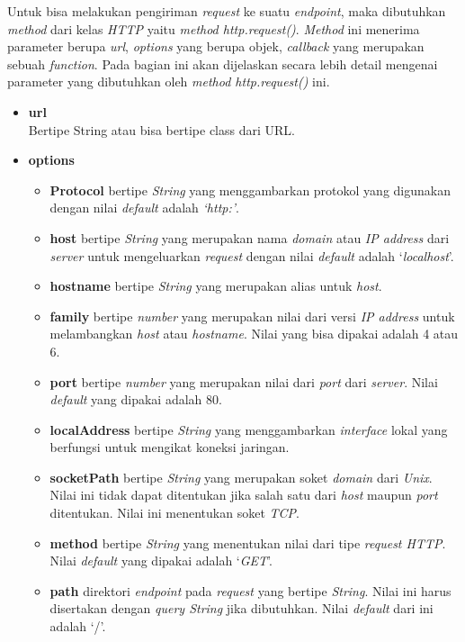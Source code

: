 \documentclass[a4paper,twoside]{article}
\begin{document}
\begin{enumerate}
Untuk bisa melakukan pengiriman \textit{request} ke suatu \textit{endpoint}, maka dibutuhkan \textit{method} dari kelas \textit{HTTP} yaitu \textit{method http.request()}. \textit{Method} ini menerima parameter berupa \textit{url}, \textit{options} yang berupa objek, \textit{callback} yang merupakan sebuah \textit{function}. Pada bagian ini akan dijelaskan secara lebih detail mengenai parameter yang dibutuhkan oleh \textit{method http.request()} ini. 
\begin{itemize}
	\item \textbf{url}\\
	Bertipe String atau bisa bertipe class dari URL. 
	\item \textbf{options}
	\begin{itemize}
		\item \textbf{Protocol} bertipe \textit{String} yang menggambarkan protokol yang digunakan dengan nilai \textit{default} adalah \textit{`http:'}. 
		\item \textbf{host} bertipe \textit{String} yang merupakan nama \textit{domain} atau \textit{IP address} dari \textit{server} untuk mengeluarkan \textit{request} dengan nilai \textit{default} adalah `\textit{localhost}'. 
		\item \textbf{hostname} bertipe \textit{String} yang merupakan alias untuk \textit{host}.
		\item \textbf{family} bertipe \textit{number} yang merupakan nilai dari versi \textit{IP address} untuk melambangkan \textit{host} atau \textit{hostname}. Nilai yang bisa dipakai adalah 4 atau 6. 
		\item \textbf{port} bertipe \textit{number} yang merupakan nilai dari \textit{port} dari \textit{server}. Nilai \textit{default} yang dipakai adalah 80. 
		\item \textbf{localAddress} bertipe \textit{String} yang menggambarkan \textit{interface} lokal yang berfungsi untuk mengikat koneksi jaringan. 
		\item \textbf{socketPath} bertipe \textit{String} yang merupakan soket \textit{domain} dari \textit{Unix}. Nilai ini tidak dapat ditentukan jika salah satu dari \textit{host} maupun \textit{port} ditentukan. Nilai ini menentukan soket \textit{TCP}. 
		\item \textbf{method} bertipe \textit{String} yang menentukan nilai dari tipe \textit{request HTTP}. Nilai \textit{default} yang dipakai adalah `\textit{GET}'. 
		\item \textbf{path} direktori \textit{endpoint} pada \textit{request} yang bertipe \textit{String}. Nilai ini harus disertakan dengan \textit{query String} jika dibutuhkan. Nilai \textit{default} dari ini adalah `/'. 

\end{itemize}
\end{itemize}
\end{enumerate}
\end{document}
